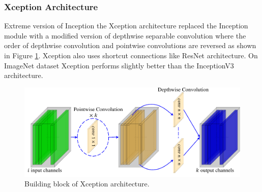 \subsubsection{Xception Architecture}
Extreme version of Inception the Xception architecture \cite{XceptionRef} replaced the Inception module with a modified version of depthwise separable convolution where the order of depthwise convolution and pointwise convolutions are reversed as shown in Figure \ref{fig:xception}. Xception also uses shortcut connections like ResNet architecture. On ImageNet dataset Xception performs slightly better than the InceptionV3 architecture.
\begin{figure}[htb!]
	\centering
	\includegraphics[width=\textwidth,keepaspectratio]{images/pretraining/pointwise-cropped.pdf}
	\caption[Building block of Xception architecture]{Building block of Xception architecture.}
	\label{fig:xception}
\end{figure}


